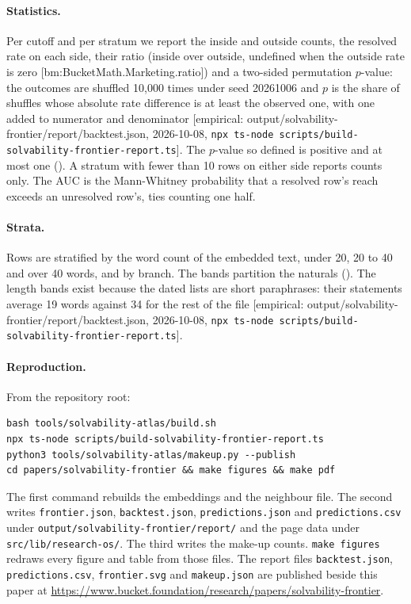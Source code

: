 \documentclass[11pt]{article}
\newcommand{\emp}[1]{\textcolor{bucketgray}{\footnotesize [empirical: #1]}}
\newcommand{\bm}[1]{\textcolor{bucketgray}{\footnotesize [bm:#1]}}
\newcommand{\cmd}{\texttt{npx ts-node scripts/build-solvability-frontier-report.ts}}
\newcommand{\bt}{\emp{output/solvability-frontier/report/backtest.json, 2026-10-08, \cmd}}
\begin{document}
\paragraph{Statistics.}
Per cutoff and per stratum we report the inside and outside counts, the resolved rate on each side, their ratio (inside over outside, undefined when the outside rate is zero \bm{BucketMath.Marketing.ratio}) and a two-sided permutation $p$-value: the outcomes are shuffled 10,000 times under seed 20261006 and $p$ is the share of shuffles whose absolute rate difference is at least the observed one, with one added to numerator and denominator \bt. The $p$-value so defined is positive and at most one (). A stratum with fewer than 10 rows on either side reports counts only. The AUC is the Mann-Whitney probability that a resolved row's reach exceeds an unresolved row's, ties counting one half.

\paragraph{Strata.}
Rows are stratified by the word count of the embedded text, under 20, 20 to 40 and over 40 words, and by branch. The bands partition the naturals (). The length bands exist because the dated lists are short paraphrases: their statements average 19 words against 34 for the rest of the file \bt.

\paragraph{Reproduction.}
From the repository root:
\begin{verbatim}
bash tools/solvability-atlas/build.sh
npx ts-node scripts/build-solvability-frontier-report.ts
python3 tools/solvability-atlas/makeup.py --publish
cd papers/solvability-frontier && make figures && make pdf
\end{verbatim}
The first command rebuilds the embeddings and the neighbour file. The second writes \texttt{frontier.json}, \texttt{backtest.json}, \texttt{predictions.json} and \texttt{predictions.csv} under \texttt{output/solvability-frontier/report/} and the page data under \texttt{src/lib/research-os/}. The third writes the make-up counts. \texttt{make figures} redraws every figure and table from those files. The report files \texttt{backtest.json}, \texttt{predictions.csv}, \texttt{frontier.svg} and \texttt{makeup.json} are published beside this paper at \url{https://www.bucket.foundation/research/papers/solvability-frontier}.
\end{document}
